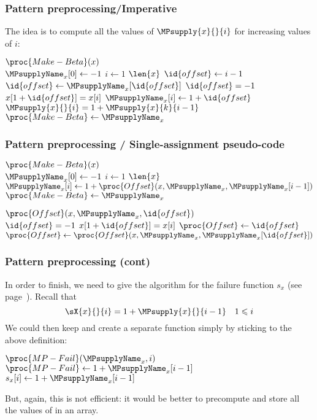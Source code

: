 %
\begin{frame}
\frametitle{Pattern preprocessing/Imperative}

The idea is to compute all the values of \(\MPsupply{x}{}{i}\) for
increasing values of \(i\):
\begin{codebox}
\(\proc{Make-Beta}(x)\)\\
\li \(\MPsupplyName_{x}[0] \gets -1\)
\li \For \(i \gets 1\) \To \(\len{x}\)
\li	\Do \(\id{offset} \gets i-1\) 
\li     \Repeat
\li       \(\id{offset} \gets \MPsupplyName_{x}[\id{offset}]\)
\li     \Until \(\id{offset} = -1\) \LogOr \(x[1+\id{offset}] = x[i]\)
\li     \(\MPsupplyName_{x}[i] \gets 1 + \id{offset}\)\RComment \(\MPsupply{x}{}{i}
= 1+\MPsupply{x}{k}{i-1}\)
    \End
\li \(\proc{Make-Beta} \gets \MPsupplyName_{x}\)
\end{codebox}

\end{frame}

%
\begin{frame}
\frametitle{Pattern preprocessing /
  Single-assignment pseudo-code}

\begin{codebox}
\(\proc{Make-Beta}(x)\)\\
\li \(\MPsupplyName_{x}[0] \gets -1\)
\li \For \(i \gets 1\) \To \(\len{x}\)
\li	\Do \(\MPsupplyName_{x}[i] \gets 1 + \proc{Offset} (x, \MPsupplyName_{x}, \MPsupplyName_{x}[i-1])\)
    \End
\li \(\proc{Make-Beta} \gets \MPsupplyName_{x}\)
\end{codebox}
\begin{codebox}
\(\proc{Offset}(x, \MPsupplyName_{x}, \id{offset})\)\\
\li \If \(\id{offset} = -1\) \LogOr \(x[1+\id{offset}] = x[i]\)
\li \Then \(\proc{Offset} \gets \id{offset}\)
\li \Else \(\proc{Offset} \gets \proc{Offset} (x, \MPsupplyName_{x},
          \MPsupplyName_{x}[\id{offset}])\)
    \End
\end{codebox}

\end{frame}

%
\begin{frame}
\frametitle{Pattern preprocessing (cont)}

In order to finish, we need to give the algorithm for the failure
function \(s_{x}\) (see page~\pageref{supply}). Recall that
\[
\sX{x}{}{i} = 1 + \MPsupply{x}{}{i-1} \quad 1 \leqslant i
\]
We could then keep  and create a separate function
 simply by sticking to the above definition:
\begin{codebox}
\(\proc{MP-Fail} (\MPsupplyName_{x}, i)\)\\
\li \(\proc{MP-Fail} \gets 1 + \MPsupplyName_{x}[i-1]\)\>\>\>\>\>\>\>\>\Comment \(s_{x}[i] \gets 1 + \MPsupplyName_{x}[i-1]\)
\end{codebox}
But, again, this is not efficient: it would be better to precompute
and store all the values of  in an array.

\end{frame}

